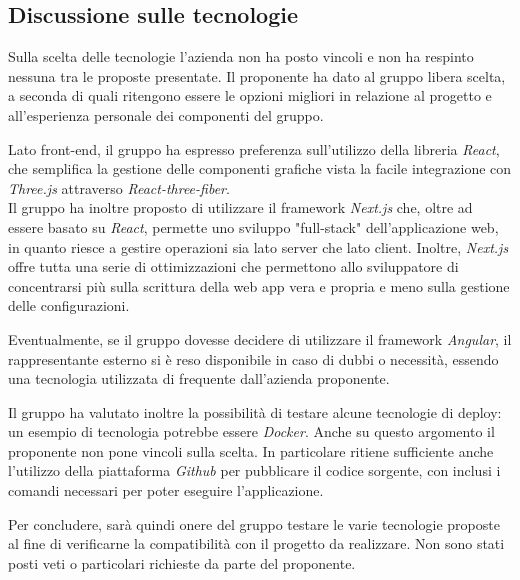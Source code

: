 \subsection{Discussione sulle tecnologie}
Sulla scelta delle tecnologie l'azienda non ha posto vincoli e non ha respinto nessuna tra le proposte presentate. Il proponente ha dato al gruppo libera scelta, 
a seconda di quali ritengono essere le opzioni migliori in relazione al progetto e all'esperienza personale dei componenti del gruppo.
\par Lato front-end, il gruppo ha espresso preferenza sull'utilizzo della libreria \textit{React}, che semplifica la gestione delle componenti grafiche vista la 
facile integrazione con \textit{Three.js} attraverso \textit{React-three-fiber}. \\
 Il gruppo ha inoltre proposto di utilizzare il framework \textit{Next.js} che, oltre ad essere basato su \textit{React}, permette uno sviluppo "full-stack" 
 dell'applicazione web, in quanto riesce a gestire operazioni sia lato server che lato client. Inoltre, \textit{Next.js} offre tutta una serie di ottimizzazioni 
 che permettono allo sviluppatore di concentrarsi più sulla scrittura della web app vera e propria e meno sulla gestione delle configurazioni.
\par Eventualmente, se il gruppo dovesse decidere di utilizzare il framework \textit{Angular}, il rappresentante esterno si è reso disponibile in caso di dubbi o necessità, 
essendo una tecnologia utilizzata di frequente dall'azienda proponente.
\par Il gruppo ha valutato inoltre la possibilità di testare alcune tecnologie di deploy: un esempio di tecnologia potrebbe essere \textit{Docker}. Anche su questo argomento
 il proponente non pone vincoli sulla scelta. In particolare ritiene sufficiente anche l'utilizzo della piattaforma \textit{Github} per pubblicare il codice sorgente, con 
 inclusi i comandi necessari per poter eseguire l'applicazione.
\par Per concludere, sarà quindi onere del gruppo testare le varie tecnologie proposte al fine di verificarne la compatibilità con il progetto da realizzare. 
Non sono stati posti veti o particolari richieste da parte del proponente.